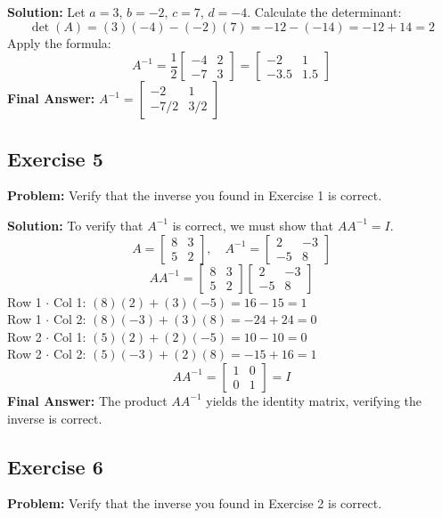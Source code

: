 \documentclass[11pt]{article}
\begin{document}
\textbf{Solution:}
Let $a=3$, $b=-2$, $c=7$, $d=-4$.
Calculate the determinant:
\[ \det(A) = (3)(-4) - (-2)(7) = -12 - (-14) = -12 + 14 = 2 \]
Apply the formula:
\[ A^{-1} = \frac{1}{2} \begin{bmatrix} -4 & 2 \\ -7 & 3 \end{bmatrix} = \begin{bmatrix} -2 & 1 \\ -3.5 & 1.5 \end{bmatrix} \]
\textbf{Final Answer:} $A^{-1} = \begin{bmatrix} -2 & 1 \\ -7/2 & 3/2 \end{bmatrix}$

\subsection{Exercise 5}
\textbf{Problem:} Verify that the inverse you found in Exercise 1 is correct.

\textbf{Solution:}
To verify that $A^{-1}$ is correct, we must show that $A A^{-1} = I$.
\[ A = \begin{bmatrix} 8 & 3 \\ 5 & 2 \end{bmatrix}, \quad A^{-1} = \begin{bmatrix} 2 & -3 \\ -5 & 8 \end{bmatrix} \]
\[ A A^{-1} = \begin{bmatrix} 8 & 3 \\ 5 & 2 \end{bmatrix} \begin{bmatrix} 2 & -3 \\ -5 & 8 \end{bmatrix} \]
Row 1 $\cdot$ Col 1: $(8)(2) + (3)(-5) = 16 - 15 = 1$ \\
Row 1 $\cdot$ Col 2: $(8)(-3) + (3)(8) = -24 + 24 = 0$ \\
Row 2 $\cdot$ Col 1: $(5)(2) + (2)(-5) = 10 - 10 = 0$ \\
Row 2 $\cdot$ Col 2: $(5)(-3) + (2)(8) = -15 + 16 = 1$
\[ A A^{-1} = \begin{bmatrix} 1 & 0 \\ 0 & 1 \end{bmatrix} = I \]
\textbf{Final Answer:} The product $AA^{-1}$ yields the identity matrix, verifying the inverse is correct.

\subsection{Exercise 6}
\textbf{Problem:} Verify that the inverse you found in Exercise 2 is correct.
\end{document}
